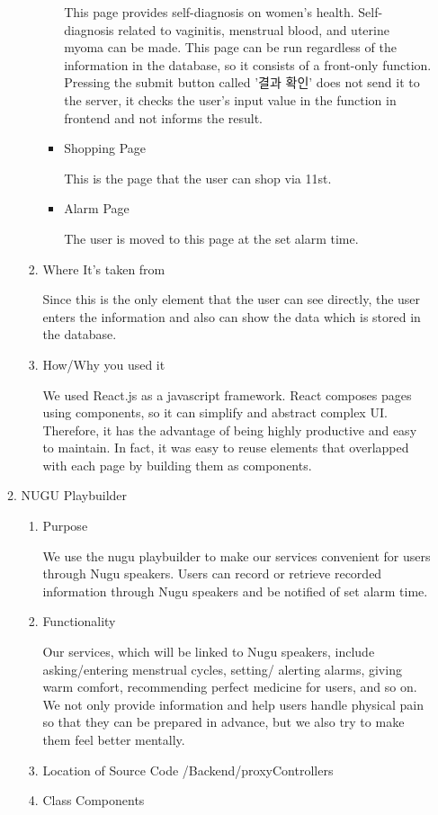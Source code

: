 \documentclass[conference]{IEEEtran}
\begin{document}
\begin{itemize}
\begin{enumerate}
\begin{enumerate}
\begin{itemize}
               \setlength{\parindent}{2ex} This page provides self-diagnosis on women's health. Self-diagnosis related to vaginitis, menstrual blood, and uterine myoma can be made. This page can be run regardless of the information in the database, so it consists of a front-only function. Pressing the submit button called '결과 확인' does not send it to the server, it checks the user's input value in the function in frontend and not informs the result.
                \item Shopping Page
            
                \setlength{\parindent}{2ex} This is the page that the user can shop via 11st.
                \item Alarm Page
            
               \setlength{\parindent}{2ex} The user is moved to  this page at the set alarm time.
            \end{itemize}
            \item Where It's taken from
            
           \setlength{\parindent}{2ex} Since this is the only element that the user can see directly, the user enters the information and also can show the data which is stored in the database.
            \item How/Why you used it
            
            \setlength{\parindent}{2ex} We used React.js as a javascript framework. React composes pages using components, so it can simplify and abstract complex UI. Therefore, it has the advantage of being highly productive and easy to maintain. In fact, it was easy to reuse elements that overlapped with each page by building them as components.

        \end{enumerate}
        \item NUGU Playbuilder
        \begin{enumerate}
            \item Purpose
            
           \setlength{\parindent}{2ex} We use the nugu playbuilder to make our services convenient for users through Nugu speakers. Users can record or retrieve recorded information through Nugu speakers and be notified of set alarm time.
            \item Functionality
            
            \setlength{\parindent}{2ex} Our services, which will be linked to Nugu speakers, include asking/entering menstrual cycles, setting/ alerting alarms, giving warm comfort, recommending perfect medicine for users, and so on. We not only provide information and help users handle physical pain so that they can be prepared in advance, but we also try to make them feel better mentally.
            \item Location of Source Code
            /Backend/proxyControllers
            \item Class Components 
            

\end{enumerate}
\end{enumerate}
\end{itemize}
\end{document}
